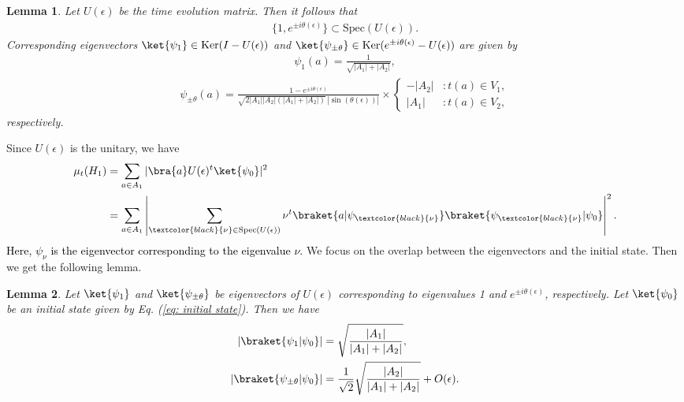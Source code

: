 \documentclass[12pt]{article}
\newtheorem{lemma}{Lemma}
\numberwithin{lemma}{section}
\numberwithin{proposition}{section}
\numberwithin{remark}{section}
\numberwithin{definition}{section}
\newcommand{\red}{\textcolor{black}}
\begin{document}
\begin{lemma}
    \label{lem: eigenpair of U}
    Let $U(\epsilon)$ be the time evolution matrix. Then it follows that
    \begin{align*}
        \{1, e^{\pm i \theta(\epsilon)}\} \subset \mathrm{Spec}(U(\epsilon)).
    \end{align*}
    Corresponding eigenvectors $\ket{\psi_1} \in \mathrm{Ker}(I-U(\epsilon))$ and $\ket{\psi_{\pm\theta}} \in \mathrm{Ker}(e^{\pm i\theta(\epsilon)}-U(\epsilon))$ are given by
    \begin{align*}
        \psi_1(a)=\frac{1}{\sqrt{|A_1|+|A_2|}},
    \end{align*} 
    \begin{align*}
        \psi_{\pm\theta}(a)=\frac{1-e^{\pm i\theta(\epsilon)}}{\sqrt{2|A_1||A_2|(|A_1|+|A_2|)}\,|\sin (\theta(\epsilon))|}\times
        \begin{cases}
            -|A_2| &: t(a) \in V_1, \\
            |A_1| &: t(a) \in V_2,
        \end{cases}
    \end{align*}
    respectively.
\end{lemma}
Since $U(\epsilon)$ is the unitary, we have
\begin{align*}
    \mu_{t}(H_1)&=\sum_{a \in A_1}|\bra{a}U(\epsilon)^t\ket{\psi_0}|^2 \\
    &=\sum_{a \in A_1}\left|\sum_{\red{\nu}\in \mathrm{Spec}(U(\epsilon))}\nu^t\braket{a|\psi_{\red{\nu}}}\braket{\psi_{\red{\nu}}|\psi_0}\right|^2.
\end{align*}
\red{
Here, $\psi_{\nu}$ is the eigenvector corresponding to the eigenvalue $\nu$.
}
We focus on the overlap between the eigenvectors and the initial state. Then we get the following lemma.
\begin{lemma}
\label{lem: overlap}
Let $\ket{\psi_1}$ and $\ket{\psi_{\pm \theta}}$ be eigenvectors of $U(\epsilon)$ corresponding to eigenvalues 1 and $e^{\pm i\theta(\epsilon)}$, respectively.
Let $\ket{\psi_0}$ be an initial state given by Eq. (\ref{eq: initial state}). Then we have
    \begin{align*}
        |\braket{\psi_1|\psi_0}|&=\sqrt{\frac{|A_1|}{|A_1|+|A_2|}}, \\
        |\braket{\psi_{\pm\theta}|\psi_0}|&=\frac{1}{\sqrt{2}}\sqrt{\frac{|A_2|}{|A_1|+|A_2|}}+O(\epsilon).
    \end{align*}
\end{lemma}
\end{document}
